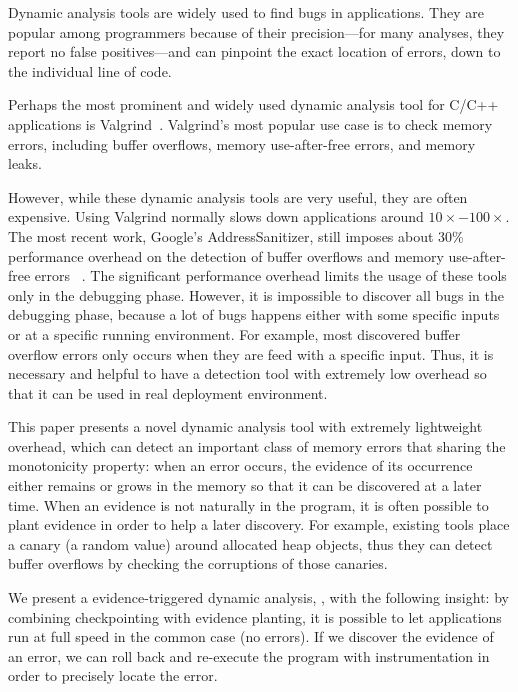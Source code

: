 
Dynamic analysis tools are widely used to find bugs in applications. They are popular among programmers because of their precision---for many analyses, they report no false positives---and can pinpoint the exact location of errors, down to the individual line of code.

Perhaps the most prominent and widely used dynamic analysis tool for C/C++ applications is Valgrind~\cite{Valgrind}. Valgrind's most popular use case is to check memory errors, including buffer overflows, memory use-after-free errors, and memory leaks.

However, while these dynamic analysis tools are very useful, they are often expensive. Using Valgrind normally slows down applications around $10\times - 100\times$. The most recent work, Google's AddressSanitizer, still imposes about 30\% performance overhead on the detection of buffer overflows and memory use-after-free errors ~\cite{AddressSanitizer}. The significant performance overhead limits the usage of these tools only in the debugging phase. However, it is impossible to discover all bugs in the debugging phase, because a lot of bugs happens either with some specific inputs or at a specific running environment. For example, most discovered buffer overflow errors only occurs when they are feed with a specific input. Thus, it is necessary and helpful to have a detection tool with extremely low overhead so that it can be used in real deployment environment.  

This paper presents a novel dynamic analysis tool with extremely lightweight overhead, which can detect an important class of memory errors that sharing the monotonicity property: when an error occurs, the evidence of its occurrence either remains or grows in the memory so that it can be discovered at a later time. When an evidence is not naturally in the program, it is often possible to plant evidence in order to help a later discovery. For example, existing tools place a canary (a random value) around allocated heap objects, thus they can detect buffer overflows by checking the corruptions of those canaries. 

We present a evidence-triggered dynamic analysis, \doubletake{}, with the following insight: by combining checkpointing with evidence planting, it is possible to let applications run at full speed in the common case (no errors). If we discover the evidence of an error, we can roll back and re-execute the program with instrumentation in order to precisely locate the error. 


